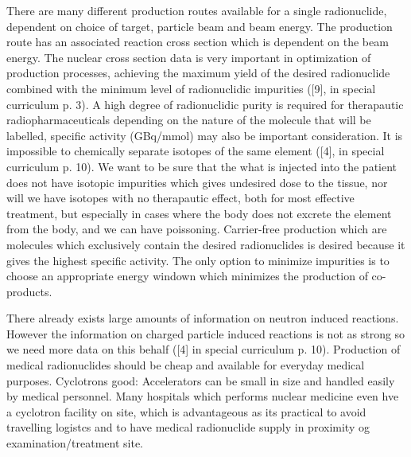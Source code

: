 \documentclass[a4paper,11pt,twoside]{book}
\begin{document}
There are many different production routes available for a single radionuclide, dependent on choice of target, particle beam and beam energy. The production route has an associated reaction cross section which is dependent on the beam energy. The nuclear cross section data is very important in optimization of production processes, achieving the maximum yield of the desired radionuclide combined with the minimum level of radionuclidic impurities ([9], in special curriculum p. 3). A high degree of radionuclidic purity is required for therapautic radiopharmaceuticals depending on the nature of the molecule that will be labelled, specific activity (GBq/mmol) may also be important consideration. It is impossible to chemically separate isotopes of the same element ([4], in special curriculum p. 10). We want to be sure that the what is injected into the patient does not have isotopic impurities which gives undesired dose to the tissue, nor will we have isotopes with no therapautic effect, both for most effective treatment, but especially in cases where the body does not excrete the element from the body, and we can have poissoning. Carrier-free production which are molecules which exclusively contain the desired radionuclides is desired because it gives the highest specific activity. The only option to minimize impurities is to choose an appropriate energy windown which minimizes the production of co-products. 

There already exists large amounts of information on neutron induced reactions. However the information on charged particle induced reactions is not as strong so we need more data on this behalf ([4] in special curriculum p. 10). Production of medical radionuclides should be cheap and available for everyday medical purposes. Cyclotrons good: Accelerators can be small in size and handled easily by medical personnel. Many hospitals which performs nuclear medicine even hve a cyclotron facility on site, which is advantageous as its practical to avoid travelling logistcs and to have medical radionuclide supply in proximity og examination/treatment site.  


\end{document}
